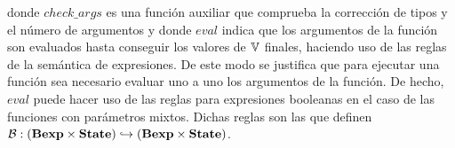 \begin{landscape}
\begin{prooftree*}
\end{prooftree*}

\begin{prooftree*}
\end{prooftree*}

\begin{prooftree*}
\end{prooftree*}
donde $check\_args$ es una función auxiliar que comprueba la corrección de tipos y el número de argumentos y donde $eval$ indica que los argumentos de la función son evaluados hasta conseguir los valores de $\mathbb{V}$ finales, haciendo uso de las reglas de la semántica de expresiones. De este modo se justifica que para ejecutar una función sea necesario evaluar uno a uno los argumentos de la función. De hecho, $eval$ puede hacer uso de las reglas para expresiones booleanas en el caso de las funciones con parámetros mixtos. Dichas reglas son las que definen $\mathcal{B}: (\textbf{Bexp} \times \textbf{State}) \hookrightarrow (\textbf{Bexp} \times \textbf{State})$.

\begin{prooftree*}
\end{prooftree*}

\begin{prooftree*}
\end{prooftree*}

\begin{prooftree*}
\end{prooftree*}


\end{landscape}

